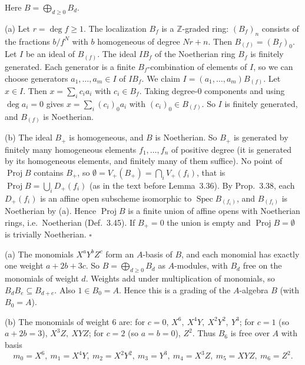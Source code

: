 \documentclass[11pt]{article}
\begin{document}
\pf
Here $B=\bigoplus_{d\ge0}B_d$.

(a) Let $r=\deg f\ge1$. The localization $B_f$ is a $\mathbb{Z}$-graded ring: $(B_f)_n$ consists of the fractions $b/f^N$ with $b$ homogeneous of degree $Nr+n$. Then $B_{(f)}=(B_f)_0$. Let $I$ be an ideal of $B_{(f)}$. The ideal $IB_f$ of the Noetherian ring $B_f$ is finitely generated. Each generator is a finite $B_f$-combination of elements of $I$, so we can choose generators $a_1,\dots,a_m\in I$ of $IB_f$. We claim $I=(a_1,\dots,a_m)B_{(f)}$. Let $x\in I$. Then $x=\sum_i c_ia_i$ with $c_i\in B_f$. Taking degree-$0$ components and using $\deg a_i=0$ gives $x=\sum_i (c_i)_0a_i$ with $(c_i)_0\in B_{(f)}$. So $I$ is finitely generated, and $B_{(f)}$ is Noetherian.

(b) The ideal $B_+$ is homogeneous, and $B$ is Noetherian. So $B_+$ is generated by finitely many homogeneous elements $f_1,\dots,f_n$ of positive degree (it is generated by its homogeneous elements, and finitely many of them suffice). No point of $\operatorname{Proj}B$ contains $B_+$, so $\emptyset=V_+(B_+)=\bigcap_iV_+(f_i)$, that is $\operatorname{Proj}B=\bigcup_iD_+(f_i)$ (as in the text before Lemma~3.36). By Prop.~3.38, each $D_+(f_i)$ is an affine open subscheme isomorphic to $\operatorname{Spec}B_{(f_i)}$, and $B_{(f_i)}$ is Noetherian by (a). Hence $\operatorname{Proj}B$ is a finite union of affine opens with Noetherian rings, i.e.\ Noetherian (Def.~3.45). If $B_+=0$ the union is empty and $\operatorname{Proj}B=\emptyset$ is trivially Noetherian. \hfill$\square$

\pf
(a) The monomials $X^aY^bZ^c$ form an $A$-basis of $B$, and each monomial has exactly one weight $a+2b+3c$. So $B=\bigoplus_{d\ge0}B_d$ as $A$-modules, with $B_d$ free on the monomials of weight $d$. Weights add under multiplication of monomials, so $B_dB_e\subseteq B_{d+e}$. Also $1\in B_0=A$. Hence this is a grading of the $A$-algebra $B$ (with $B_0=A$).

(b) The monomials of weight $6$ are: for $c=0$, $X^6,\ X^4Y,\ X^2Y^2,\ Y^3$; for $c=1$ (so $a+2b=3$), $X^3Z,\ XYZ$; for $c=2$ (so $a=b=0$), $Z^2$. Thus $B_6$ is free over $A$ with basis
\[ m_0=X^6,\ m_1=X^4Y,\ m_2=X^2Y^2,\ m_3=Y^3,\ m_4=X^3Z,\ m_5=XYZ,\ m_6=Z^2. \]
\end{document}
